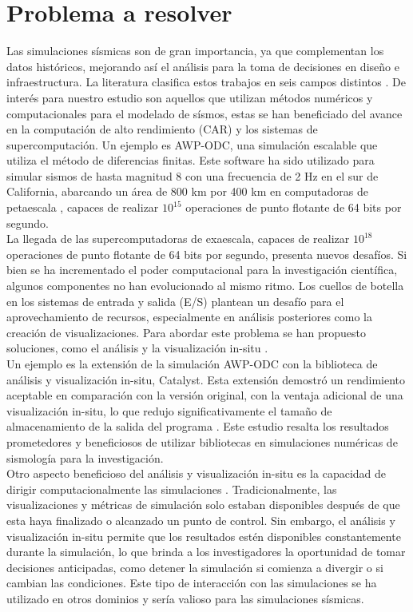\documentclass{article}
\begin{document}
\section{Problema a resolver}
Las simulaciones sísmicas son de gran importancia, ya que complementan los datos históricos, mejorando así el análisis para la toma de decisiones en diseño e infraestructura. La literatura clasifica estos trabajos en seis campos distintos \cite{poursartip_large-scale_2020}. De interés para nuestro estudio son aquellos que utilizan métodos numéricos y computacionales para el modelado de sísmos, estas se han beneficiado del avance en la computación de alto rendimiento (CAR) y los sistemas de supercomputación. Un ejemplo es AWP-ODC, una simulación escalable que utiliza el método de diferencias finitas. Este software ha sido utilizado para simular sismos de hasta magnitud 8 con una frecuencia de 2 Hz en el sur de California, abarcando un área de 800 km por 400 km en computadoras de petaescala \cite{Cui2010}, capaces de realizar $10^{15}$ operaciones de punto flotante de 64 bits por segundo.\\
La llegada de las supercomputadoras de exaescala, capaces de realizar $10^{18}$ operaciones de punto flotante de 64 bits por segundo, presenta nuevos desafíos. Si bien se ha incrementado el poder computacional para la investigación científica, algunos componentes no han evolucionado al mismo ritmo. Los cuellos de botella en los sistemas de entrada y salida (E/S) plantean un desafío para el aprovechamiento de recursos, especialmente en análisis posteriores como la creación de visualizaciones. Para abordar este problema se han propuesto soluciones, como el análisis y la visualización in-situ \cite{akira_kageyama_approach_2014}.\\
Un ejemplo es la extensión de la simulación AWP-ODC con la biblioteca de análisis y visualización in-situ, Catalyst. Esta extensión demostró un rendimiento aceptable en comparación con la versión original, con la ventaja adicional de una visualización in-situ, lo que redujo significativamente el tamaño de almacenamiento de la salida del programa \cite{mu_-situ_2019}. Este estudio resalta los resultados prometedores y beneficiosos de utilizar bibliotecas en simulaciones numéricas de sismología para la investigación.\\
Otro aspecto beneficioso del análisis y visualización in-situ es la capacidad de dirigir computacionalmente las simulaciones \cite{Grosset2020}. Tradicionalmente, las visualizaciones y métricas de simulación solo estaban disponibles después de que esta haya finalizado o alcanzado un punto de control. Sin embargo, el análisis y visualización in-situ permite que los resultados estén disponibles constantemente durante la simulación, lo que brinda a los investigadores la oportunidad de tomar decisiones anticipadas, como detener la simulación si comienza a divergir o si cambian las condiciones. Este tipo de interacción con las simulaciones se ha utilizado en otros dominios \cite{Yi2014} y sería valioso para las simulaciones sísmicas.\\
\end{document}
